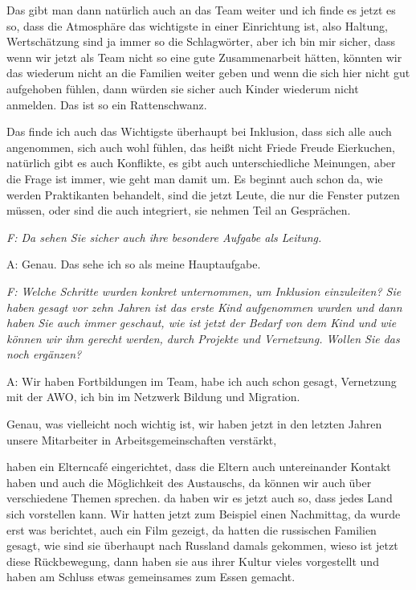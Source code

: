 \begin{linenumbers*}
Das gibt man dann natürlich auch an das Team weiter und ich finde es jetzt es so, dass die Atmosphäre das wichtigste in einer Einrichtung ist, also Haltung, Wertschätzung sind ja immer so die Schlagwörter, aber ich bin mir sicher, dass wenn wir jetzt als Team nicht so eine gute Zusammenarbeit hätten, könnten wir das wiederum nicht an die Familien weiter geben und wenn die sich hier nicht gut aufgehoben fühlen, dann würden sie sicher auch Kinder wiederum nicht anmelden. Das ist so ein Rattenschwanz. 

Das finde ich auch das Wichtigste überhaupt bei Inklusion, dass sich alle auch angenommen, sich auch wohl fühlen, das heißt nicht Friede Freude Eierkuchen, natürlich gibt es auch Konflikte, es gibt auch unterschiedliche Meinungen, aber die Frage ist immer, wie geht man damit um. Es beginnt auch schon da, wie werden Praktikanten behandelt, sind die jetzt Leute, die nur die Fenster putzen müssen, oder sind die auch integriert, sie nehmen Teil an Gesprächen. 

\emph{F: Da sehen Sie sicher auch ihre besondere Aufgabe als Leitung.}

A: Genau. Das sehe ich so als meine Hauptaufgabe. 

\emph{F: Welche Schritte wurden konkret unternommen, um Inklusion einzuleiten? Sie haben gesagt vor zehn Jahren ist das erste Kind aufgenommen wurden und dann haben Sie auch immer geschaut, wie ist jetzt der Bedarf von dem Kind und wie können wir ihm gerecht werden, durch Projekte und Vernetzung. Wollen Sie das noch ergänzen?}

A: Wir haben Fortbildungen im Team, habe ich auch schon gesagt, Vernetzung mit der AWO, ich bin im Netzwerk Bildung und Migration. 

Genau, was vielleicht noch wichtig ist, wir haben jetzt in den letzten Jahren unsere Mitarbeiter in Arbeitsgemeinschaften verstärkt, 

haben ein Elterncafé eingerichtet, dass die Eltern auch untereinander Kontakt haben und auch die Möglichkeit des Austauschs, da können wir auch über verschiedene Themen sprechen. 
da haben wir es jetzt auch so, dass jedes Land sich vorstellen kann. Wir hatten jetzt zum Beispiel einen Nachmittag, da wurde erst was berichtet, auch ein Film gezeigt, da hatten die russischen Familien gesagt, wie sind sie überhaupt nach Russland damals gekommen, wieso ist jetzt diese Rückbewegung, dann haben sie aus ihrer Kultur vieles vorgestellt und haben am Schluss etwas gemeinsames zum Essen gemacht.


\end{linenumbers*}
